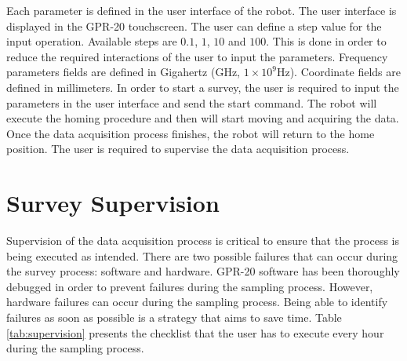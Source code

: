 \documentclass{article}
\begin{document}
Each parameter is defined in the user interface of the robot. The user interface is displayed in the GPR-20 touchscreen. The user can define a step value for the input operation. Available steps are $0.1$, $1$, $10$ and $100$. This is done in order to reduce the required interactions of the user to input the parameters. Frequency parameters fields are defined in Gigahertz (GHz, $1\times 10^{9}$Hz). Coordinate fields are defined in millimeters. In order to start a survey, the user is required to input the parameters in the user interface and send the start command. The robot will execute the homing procedure and then will start moving and acquiring the data. Once the data acquisition process finishes, the robot will return to the home position. The user is required to supervise the data acquisition process. 


\newpage
\section{Survey Supervision}
Supervision of the data acquisition process is critical to ensure that the process is being executed as intended. There are two possible failures that can occur during the survey process: software and hardware. GPR-20 software has been thoroughly debugged in order to prevent failures during the sampling process. However, hardware failures can occur during the sampling process. Being able to identify failures as soon as possible is a strategy that aims to save time. Table \ref{tab:supervision} presents the checklist that the user has to execute every hour during the sampling process.
\end{document}
